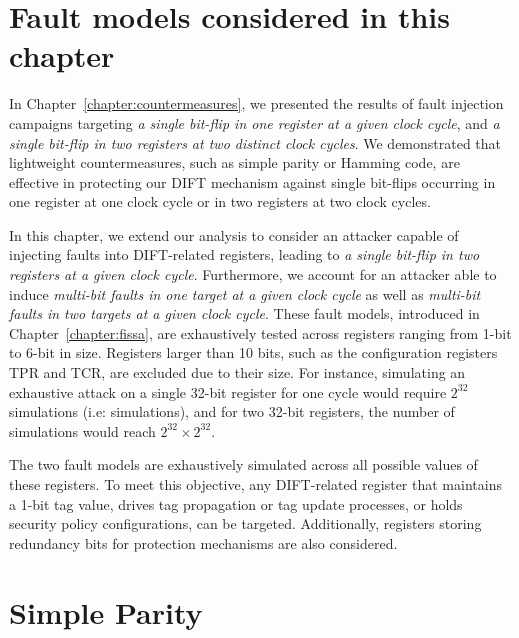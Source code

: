 \section{Fault models considered in this chapter}
\label{section:chap6_faultmodels}
In Chapter~\ref{chapter:countermeasures}, we presented the results of fault injection campaigns targeting \textit{a single bit-flip in one register at a given clock cycle}, and \textit{a single bit-flip in two registers at two distinct clock cycles}. We demonstrated that lightweight countermeasures, such as simple parity or Hamming code, are effective in protecting our DIFT mechanism against single bit-flips occurring in one register at one clock cycle or in two registers at two clock cycles.

In this chapter, we extend our analysis to consider an attacker capable of injecting faults into DIFT-related registers, leading to \textit{a single bit-flip in two registers at a given clock cycle}. Furthermore, we account for an attacker able to induce \textit{multi-bit faults in one target at a given clock cycle} as well as \textit{multi-bit faults in two targets at a given clock cycle}. These fault models, introduced in Chapter~\ref{chapter:fissa}, are exhaustively tested across registers ranging from 1-bit to 6-bit in size. Registers larger than 10 bits, such as the configuration registers TPR and TCR, are excluded due to their size. For instance, simulating an exhaustive attack on a single 32-bit register for one cycle would require $2^{32}$ simulations (i.e:  simulations), and for two 32-bit registers, the number of simulations would reach $2^{32} \times 2^{32}$.

The two fault models are exhaustively simulated across all possible values of these registers. To meet this objective, any DIFT-related register that maintains a 1-bit tag value, drives tag propagation or tag update processes, or holds security policy configurations, can be targeted. Additionally, registers storing redundancy bits for protection mechanisms are also considered.

\section{Simple Parity}
\label{section:chap6_simple_parity}

